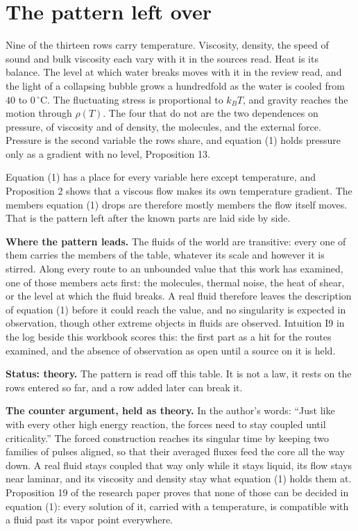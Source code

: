 \section{The pattern left over}

Nine of the thirteen rows carry temperature. Viscosity, density, the speed of sound and bulk
viscosity each vary with it in the sources read. Heat is its balance. The level at which water
breaks moves with it in the review read, and the light of a collapsing bubble grows a hundredfold
as the water is cooled from $40$ to $0\,^\circ$C. The fluctuating stress is proportional to $k_BT$,
and gravity reaches the motion through $\rho(T)$. The four that do not are the two dependences on
pressure, of viscosity and of density, the molecules, and the external force. Pressure is the
second variable the rows share, and equation (1) holds pressure only as a gradient with no level,
Proposition 13.

Equation (1) has a place for every variable here except temperature, and Proposition 2 shows that a
viscous flow makes its own temperature gradient. The members equation (1) drops are therefore
mostly members the flow itself moves. That is the pattern left after the known parts are laid
side by side.

\textbf{Where the pattern leads.} The fluids of the world are transitive: every one of them carries
the members of the table, whatever its scale and however it is stirred. Along every route to an
unbounded value that this work has examined, one of those members acts first: the molecules,
thermal noise, the heat of shear, or the level at which the fluid breaks. A real fluid therefore
leaves the description of equation (1) before it could reach the value, and no singularity is
expected in observation, though other extreme objects in fluids are observed. Intuition I9 in the
log beside this workbook scores this: the first part as a hit for the routes examined, and the
absence of observation as open until a source on it is held.

\textbf{Status: theory.} The pattern is read off this table. It is not a law, it rests on the rows
entered so far, and a row added later can break it.

\textbf{The counter argument, held as theory.} In the author's words: ``Just like with every other
high energy reaction, the forces need to stay coupled until criticality.'' The forced construction
reaches its singular time by keeping two families of pulses aligned, so that their averaged
fluxes feed the core all the way down. A real fluid stays coupled that way only while it stays
liquid, its flow stays near laminar, and its viscosity and density stay what equation (1) holds
them at. Proposition 19 of the research paper proves that none of those can be decided in
equation (1): every solution of it, carried with a temperature, is compatible with a fluid past its
vapor point everywhere.

